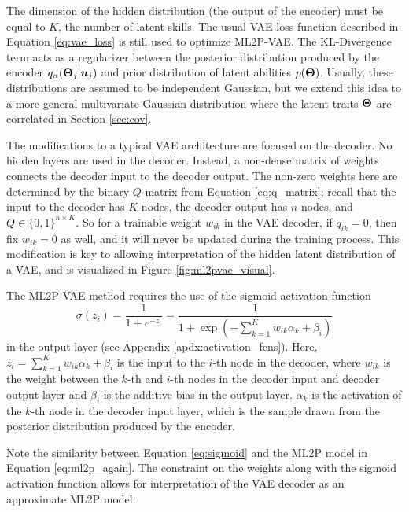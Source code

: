 The dimension of the hidden distribution (the output of the encoder) must be equal to $K$, the number of latent skills. The usual VAE loss function described in Equation \ref{eq:vae_loss} is still used to optimize ML2P-VAE. The KL-Divergence term acts as a regularizer between the posterior distribution produced by the encoder $q_\alpha(\boldsymbol{\Theta}_j | \boldsymbol{u}_j)$ and prior distribution of latent abilities $p(\boldsymbol{\Theta})$. Usually, these distributions are assumed to be independent Gaussian, but we extend this idea to a more general multivariate Gaussian distribution where the latent traits $\boldsymbol{\Theta}$ are correlated in Section \ref{sec:cov}.

The modifications to a typical VAE architecture are focused on the decoder. No hidden layers are used in the decoder. Instead, a non-dense matrix of weights connects the decoder input to the decoder output. The non-zero weights here are determined by the binary $Q$-matrix from Equation \ref{eq:q_matrix}; recall that the input to the decoder has $K$ nodes, the decoder output has $n$ nodes, and $Q \in \{0,1\}^{n \times K}$. So for a trainable weight $w_{ik}$ in the VAE decoder, if $q_{ik}=0$, then fix $w_{ik}=0$ as well, and it will never be updated during the training process. This modification is key to allowing interpretation of the hidden latent distribution of a VAE, and is visualized in Figure \ref{fig:ml2pvae_visual}.

The ML2P-VAE method requires the use of the sigmoid activation function
\begin{equation}
  \sigma(z_i) = \frac{1}{1 + e^{-z_i}} = \frac{1}{1 + \exp\left(- \sum_{k=1}^K w_{ik} \alpha_k + \beta_i \right)}
  \label{eq:sigmoid}
\end{equation}
in the output layer (see Appendix \ref{apdx:activation_fcns}). Here, $z_i = \sum_{k=1}^K w_{ik}\alpha_{k} + \beta_i$ is the input to the $i$-th node in the decoder, where $w_{ik}$ is the weight between the $k$-th and $i$-th nodes in the decoder input and decoder output layer and $\beta_i$ is the additive bias in the output layer. $\alpha_k$ is the activation of the $k$-th node in the decoder input layer, which is the sample drawn from the posterior distribution produced by the encoder. 

Note the similarity between Equation \ref{eq:sigmoid} and the ML2P model in Equation \ref{eq:ml2p_again}. The constraint on the weights along with the sigmoid activation function allows for interpretation of the VAE decoder as an approximate ML2P model.

